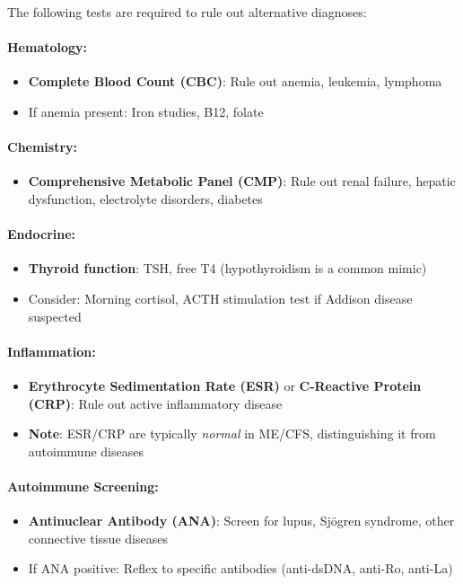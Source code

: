 \begin{requirement}
\label{req:lab-workup}
The following tests are required to rule out alternative diagnoses:

\paragraph{Hematology:}
\begin{itemize}
    \item \textbf{Complete Blood Count (CBC)}: Rule out anemia, leukemia, lymphoma
    \item If anemia present: Iron studies, B12, folate
\end{itemize}

\paragraph{Chemistry:}
\begin{itemize}
    \item \textbf{Comprehensive Metabolic Panel (CMP)}: Rule out renal failure, hepatic dysfunction, electrolyte disorders, diabetes
\end{itemize}

\paragraph{Endocrine:}
\begin{itemize}
    \item \textbf{Thyroid function}: TSH, free T4 (hypothyroidism is a common mimic)
    \item Consider: Morning cortisol, ACTH stimulation test if Addison disease suspected
\end{itemize}

\paragraph{Inflammation:}
\begin{itemize}
    \item \textbf{Erythrocyte Sedimentation Rate (ESR)} or \textbf{C-Reactive Protein (CRP)}: Rule out active inflammatory disease
    \item \textbf{Note}: ESR/CRP are typically \textit{normal} in ME/CFS, distinguishing it from autoimmune diseases
\end{itemize}

\paragraph{Autoimmune Screening:}
\begin{itemize}
    \item \textbf{Antinuclear Antibody (ANA)}: Screen for lupus, Sjögren syndrome, other connective tissue diseases
    \item If ANA positive: Reflex to specific antibodies (anti-dsDNA, anti-Ro, anti-La)
\end{itemize}


\end{requirement}
